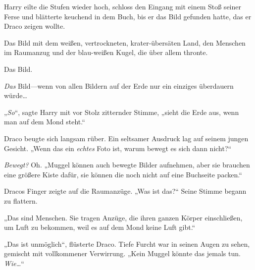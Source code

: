Harry eilte die Stufen wieder hoch, schloss den Eingang mit einem Stoß seiner Ferse und blätterte keuchend in dem Buch, bis er das Bild gefunden hatte, das er Draco zeigen wollte.

Das Bild mit dem weißen, vertrockneten, krater-übersäten Land, den Menschen im Raumanzug und der blau-weißen Kugel, die über allem thronte.

Das Bild.

\emph{Das} Bild—wenn von allen Bildern auf der Erde nur ein einziges überdauern würde…

„\emph{So}“, sagte Harry mit vor Stolz zitternder Stimme, „sieht die Erde aus, wenn man auf dem Mond steht.“

Draco beugte sich langsam rüber. Ein seltsamer Ausdruck lag auf seinem jungen Gesicht. „Wenn das ein \emph{echtes} Foto ist, warum bewegt es sich dann nicht?“

\emph{Bewegt?} Oh. „Muggel können auch bewegte Bilder aufnehmen, aber sie brauchen eine größere Kiste dafür, sie können die noch nicht auf eine Buchseite packen.“

Dracos Finger zeigte auf die Raumanzüge. „Was ist das?“ Seine Stimme begann zu flattern.

„Das sind Menschen. Sie tragen Anzüge, die ihren ganzen Körper einschließen, um Luft zu bekommen, weil es auf dem Mond keine Luft gibt.“

„Das ist unmöglich“, flüsterte Draco. Tiefe Furcht war in seinen Augen zu sehen, gemischt mit vollkommener Verwirrung. „Kein Muggel könnte das jemals tun. \emph{Wie…}“

